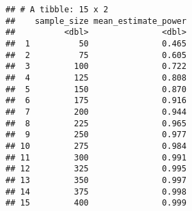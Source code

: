 \documentclass[]{article}
\newenvironment{Shaded}{\begin{snugshade}}{\end{snugshade}}
\newcommand{\KeywordTok}[1]{\textcolor[rgb]{0.13,0.29,0.53}{\textbf{#1}}}
\newcommand{\DataTypeTok}[1]{\textcolor[rgb]{0.13,0.29,0.53}{#1}}
\newcommand{\StringTok}[1]{\textcolor[rgb]{0.31,0.60,0.02}{#1}}
\newcommand{\OperatorTok}[1]{\textcolor[rgb]{0.81,0.36,0.00}{\textbf{#1}}}
\newcommand{\NormalTok}[1]{#1}
\begin{document}
\begin{Shaded}
\end{Shaded}

\begin{verbatim}
## # A tibble: 15 x 2
##    sample_size mean_estimate_power
##          <dbl>               <dbl>
##  1          50               0.465
##  2          75               0.605
##  3         100               0.722
##  4         125               0.808
##  5         150               0.870
##  6         175               0.916
##  7         200               0.944
##  8         225               0.965
##  9         250               0.977
## 10         275               0.984
## 11         300               0.991
## 12         325               0.995
## 13         350               0.997
## 14         375               0.998
## 15         400               0.999
\end{verbatim}
\end{document}
